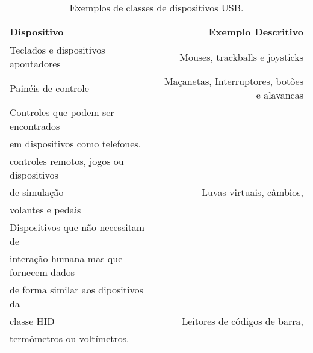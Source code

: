 \begin{table}
	\begin{center}
		\begin{tabular}{lr}
		\hline
		\textbf{Dispositivo} & \textbf{Exemplo Descritivo} \\
		\hline
		Teclados e dispositivos apontadores & Mouses, trackballs e joysticks \\
		Painéis de controle & Maçanetas, Interruptores, botões e alavancas \\
		Controles que podem ser encontrados \\
		em dispositivos como telefones,\\
		controles remotos, jogos ou dispositivos \\
		de simulação & Luvas virtuais, câmbios, \\
		volantes e pedais \\
		Dispositivos que não necessitam de \\
		interação humana mas que fornecem dados \\
		de forma similar aos dipositivos da \\
		classe HID & Leitores de códigos de barra, \\termômetros ou voltímetros. \\
		\hline
		\end{tabular}
	\end{center}
	\caption{Exemplos de classes de dispositivos USB.}
	\label{tab:dispositivos_USB}
\end{table}